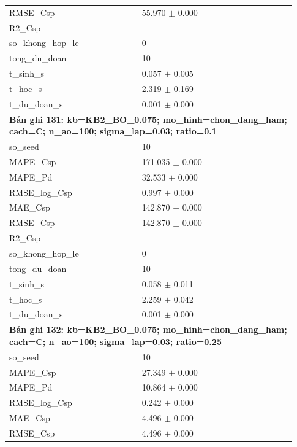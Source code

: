 \begin{longtable}{p{0.43\linewidth}p{0.50\linewidth}}
RMSE\_\allowbreak Csp & 55.970 $\pm$ 0.000 \\
R2\_\allowbreak Csp & — \\
so\_\allowbreak khong\_\allowbreak hop\_\allowbreak le & 0 \\
tong\_\allowbreak du\_\allowbreak doan & 10 \\
t\_\allowbreak sinh\_\allowbreak s & 0.057 $\pm$ 0.005 \\
t\_\allowbreak hoc\_\allowbreak s & 2.319 $\pm$ 0.169 \\
t\_\allowbreak du\_\allowbreak doan\_\allowbreak s & 0.001 $\pm$ 0.000 \\
\midrule
\multicolumn{2}{p{0.95\linewidth}}{\textbf{Bản ghi 131: kb=KB2\_BO\_0.075; mo\_hinh=chon\_dang\_ham; cach=C; n\_ao=100; sigma\_lap=0.03; ratio=0.1}} \\
so\_\allowbreak seed & 10 \\
MAPE\_\allowbreak Csp & 171.035 $\pm$ 0.000 \\
MAPE\_\allowbreak Pd & 32.533 $\pm$ 0.000 \\
RMSE\_\allowbreak log\_\allowbreak Csp & 0.997 $\pm$ 0.000 \\
MAE\_\allowbreak Csp & 142.870 $\pm$ 0.000 \\
RMSE\_\allowbreak Csp & 142.870 $\pm$ 0.000 \\
R2\_\allowbreak Csp & — \\
so\_\allowbreak khong\_\allowbreak hop\_\allowbreak le & 0 \\
tong\_\allowbreak du\_\allowbreak doan & 10 \\
t\_\allowbreak sinh\_\allowbreak s & 0.058 $\pm$ 0.011 \\
t\_\allowbreak hoc\_\allowbreak s & 2.259 $\pm$ 0.042 \\
t\_\allowbreak du\_\allowbreak doan\_\allowbreak s & 0.001 $\pm$ 0.000 \\
\midrule
\multicolumn{2}{p{0.95\linewidth}}{\textbf{Bản ghi 132: kb=KB2\_BO\_0.075; mo\_hinh=chon\_dang\_ham; cach=C; n\_ao=100; sigma\_lap=0.03; ratio=0.25}} \\
so\_\allowbreak seed & 10 \\
MAPE\_\allowbreak Csp & 27.349 $\pm$ 0.000 \\
MAPE\_\allowbreak Pd & 10.864 $\pm$ 0.000 \\
RMSE\_\allowbreak log\_\allowbreak Csp & 0.242 $\pm$ 0.000 \\
MAE\_\allowbreak Csp & 4.496 $\pm$ 0.000 \\
RMSE\_\allowbreak Csp & 4.496 $\pm$ 0.000 \\

\end{longtable}
